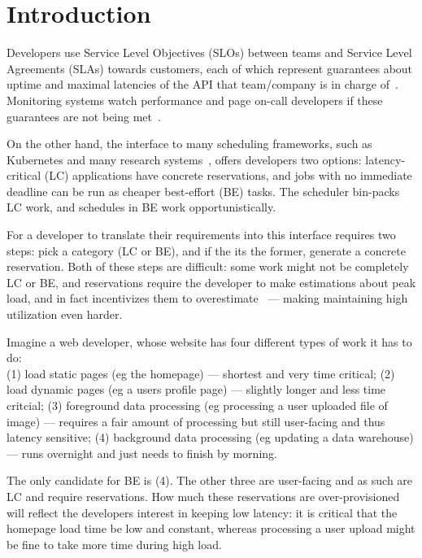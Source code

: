 \section{Introduction}

Developers use Service Level Objectives (SLOs) between teams and Service Level
Agreements (SLAs) towards customers, each of which represent guarantees about
uptime and maximal latencies of the API that team/company is in charge
of~\cite{awssla}. Monitoring systems watch performance and page on-call
developers if these guarantees are not being met~\cite{cloudwatch}.

On the other hand, the interface to many scheduling frameworks, such as
Kubernetes and many research systems~\cite{caladan}, offers developers two
options: latency-critical (LC) applications have concrete reservations, and jobs
with no immediate deadline can be run as cheaper best-effort (BE) tasks. The
scheduler bin-packs LC work, and schedules in BE work opportunistically.


For a developer to translate their requirements into this interface requires two
steps: pick a category (LC or BE), and if the its the former, generate a
concrete reservation. Both of these steps are difficult: some work might not be
completely LC or BE, and reservations require the developer to make estimations
about peak load, and in fact incentivizes them to
overestimate~\cite*{overprovision} --- making maintaining high utilization even
harder.

Imagine a web developer, whose website has four different types of work it has
to do: \\
(1) load static pages (eg the homepage) --- shortest and very time critical; 
(2) load dynamic pages (eg a users profile page) --- slightly longer and less
time critcial;
(3) foreground data processing (eg processing a user uploaded file of image) ---
requires a fair amount of processing but still user-facing and thus latency
sensitive;
(4) background data processing (eg updating a data warehouse) --- runs overnight
and just needs to finish by morning.

The only candidate for BE is (4). The other three are user-facing and as such
are LC and require reservations. How much these reservations are
over-provisioned will reflect the developers interest in keeping low latency: it
is critical that the homepage load time be low and constant, whereas processing
a user upload might be fine to take more time during high load.

